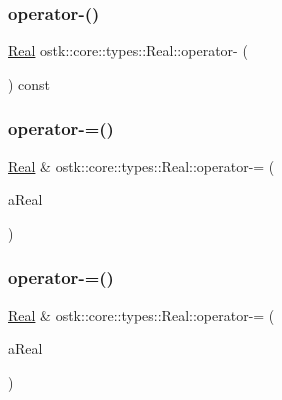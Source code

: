\subsubsection{\texorpdfstring{operator-\/()}{operator-()}\hspace{0.1cm}{\footnotesize\ttfamily [4/4]}}
{\footnotesize\ttfamily \hyperlink{classostk_1_1core_1_1types_1_1_real}{Real} ostk\+::core\+::types\+::\+Real\+::operator-\/ (\begin{DoxyParamCaption}{ }\end{DoxyParamCaption}) const}

\mbox{\label{classostk_1_1core_1_1types_1_1_real_af7890ca47160b5744b3ce6b686dd4dc8}} 
\subsubsection{\texorpdfstring{operator-\/=()}{operator-=()}\hspace{0.1cm}{\footnotesize\ttfamily [1/2]}}
{\footnotesize\ttfamily \hyperlink{classostk_1_1core_1_1types_1_1_real}{Real} \& ostk\+::core\+::types\+::\+Real\+::operator-\/= (\begin{DoxyParamCaption}\item[{const \hyperlink{classostk_1_1core_1_1types_1_1_real}{Real} \&}]{a\+Real }\end{DoxyParamCaption})}

\mbox{\label{classostk_1_1core_1_1types_1_1_real_acfe92cf33b9c0752041d5966867105f8}} 
\subsubsection{\texorpdfstring{operator-\/=()}{operator-=()}\hspace{0.1cm}{\footnotesize\ttfamily [2/2]}}
{\footnotesize\ttfamily \hyperlink{classostk_1_1core_1_1types_1_1_real}{Real} \& ostk\+::core\+::types\+::\+Real\+::operator-\/= (\begin{DoxyParamCaption}\item[{const \hyperlink{classostk_1_1core_1_1types_1_1_real_aa26f796c30b514c98d573f82e3b02296}{Real\+::\+Value\+Type} \&}]{a\+Real }\end{DoxyParamCaption})}

